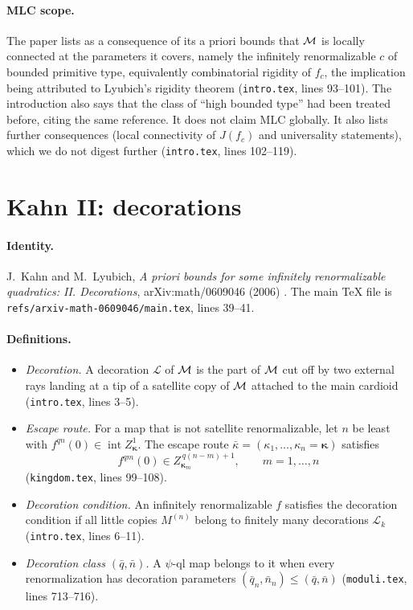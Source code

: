 \paragraph{MLC scope.}
The paper lists as a consequence of its a priori bounds that $\mathcal M$ is locally connected at the parameters it covers, namely the
infinitely renormalizable $c$ of bounded primitive type, equivalently combinatorial rigidity
of $f_c$, the implication being attributed to Lyubich's rigidity theorem (\texttt{intro.tex}, lines 93--101).  The introduction also says that the class of ``high bounded type'' had been treated before, citing the same reference.  It does not claim MLC globally.  It also
lists further consequences (local connectivity of $J(f_c)$ and universality statements),
which we do not digest further (\texttt{intro.tex}, lines 102--119).

\section{Kahn II: decorations}
\label{sec:kahn-II}

\paragraph{Identity.}
J.~Kahn and M.~Lyubich, \emph{A priori bounds for some infinitely renormalizable
quadratics: II. Decorations}, arXiv:math/0609046 (2006) \cite{KahnLyubichDecorations}.  The main TeX file is
\texttt{refs/arxiv-math-0609046/main.tex}, lines 39--41.

\paragraph{Definitions.}
\begin{itemize}
\item \emph{Decoration.} A decoration $\mathcal L$ of $\mathcal M$ is the part of $\mathcal M$ cut off by two
external rays landing at a tip of a satellite copy of $\mathcal M$ attached to the main cardioid
(\texttt{intro.tex}, lines 3--5).
\item \emph{Escape route.} For a map that is not satellite renormalizable, let $n$ be least
with $f^{qn}(0)\in\operatorname{int}Z^1_{\boldsymbol\kappa}$.  The escape route
$\bar\kappa=(\kappa_1,\dots,\kappa_n=\boldsymbol\kappa)$ satisfies
\[
f^{qm}(0)\in Z^{\,q(n-m)+1}_{\boldsymbol\kappa_m},\qquad m=1,\dots,n
\]
(\texttt{kingdom.tex}, lines 99--108).
\item \emph{Decoration condition.} An infinitely renormalizable $f$ satisfies the decoration
condition if all little copies $M^{(n)}$ belong to finitely many decorations
$\mathcal L_k$
(\texttt{intro.tex}, lines 6--11).
\item \emph{Decoration class $(\bar q,\bar n)$.} A $\psi$-ql map belongs to it when every
renormalization has decoration parameters $(\bar q_n,\bar n_n)\le(\bar q,\bar n)$
(\texttt{moduli.tex}, lines 713--716).
\end{itemize}

